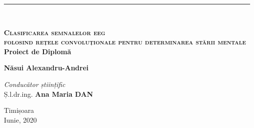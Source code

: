\begin{titlepage}
    \noindent\rule{\textwidth}{1pt}\\[2.5cm]

    \begin{center}
        {\huge \bfseries \textsc{Clasificarea semnalelor eeg\\[0.2cm]folosind rețele convoluționale pentru determinarea stării mentale}}\\[1cm]

        {\large \bfseries Proiect de Diplomă}\\[4.5cm]
        
        \begin{flushright}
            \large
            \textbf{Năsui Alexandru-Andrei} \\[1cm]
        \end{flushright}
        \begin{flushleft}
            \large
            \textit{Conducător științific}\\
            Ș.l.dr.ing. \textbf{Ana Maria DAN} \\[1cm]
        \end{flushleft}
        \vfill
        {\small Timișoara \\Iunie, 2020}
    \end{center}
\end{titlepage}
\restoregeometry
\shipout\null